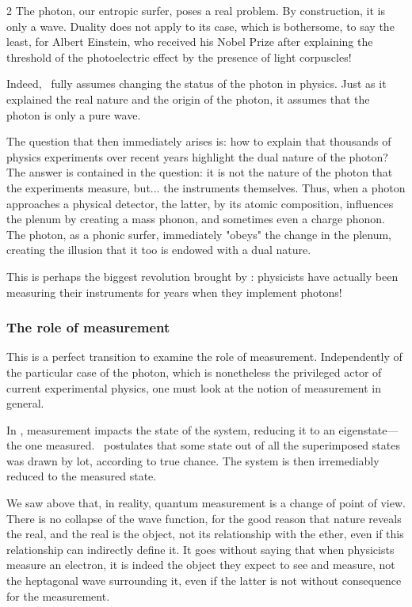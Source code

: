 \begin{multicols}{2}
	The photon, our entropic surfer, poses a real problem. By construction, it is only a wave. Duality does not apply to its case, which is bothersome, to say the least, for Albert Einstein, who received his Nobel Prize after explaining the threshold of the photoelectric effect by the presence of light corpuscles!
	
	Indeed, \PQ\ fully assumes changing the status of the photon in physics. Just as it explained the real nature and the origin of the photon, it assumes that the photon is only a pure wave.
	
	The question that then immediately arises is: how to explain that thousands of physics experiments over recent years highlight the dual nature of the photon? The answer is contained in the question: it is not the nature of the photon that the experiments measure, but... the instruments themselves. Thus, when a photon approaches a physical detector, the latter, by its atomic composition, influences the plenum by creating a mass phonon, and sometimes even a charge phonon. The photon, as a phonic surfer, immediately "obeys" the change in the plenum, creating the illusion that it too is endowed with a dual nature.
	
	This is perhaps the biggest revolution brought by \PQ: physicists have actually been measuring their instruments for years when they implement photons!
	
	\subsubsection{The role of measurement}
	
	This is a perfect transition to examine the role of measurement. Independently of the particular case of the photon, which is nonetheless the privileged actor of current experimental physics, one must look at the notion of measurement in general.
	
	In \MQ, measurement impacts the state of the system, reducing it to an eigenstate—the one measured. \MQ\ postulates that some state out of all the superimposed states was drawn by lot, according to true chance. The system is then irremediably reduced to the measured state.
	
	We saw above that, in reality, quantum measurement is a change of point of view. There is no collapse of the wave function, for the good reason that nature reveals the real, and the real is the object, not its relationship with the ether, even if this relationship can indirectly define it. It goes without saying that when physicists measure an electron, it is indeed the  object they expect to see and measure, not the heptagonal wave surrounding it, even if the latter is not without consequence for the measurement.
	

\end{multicols}
